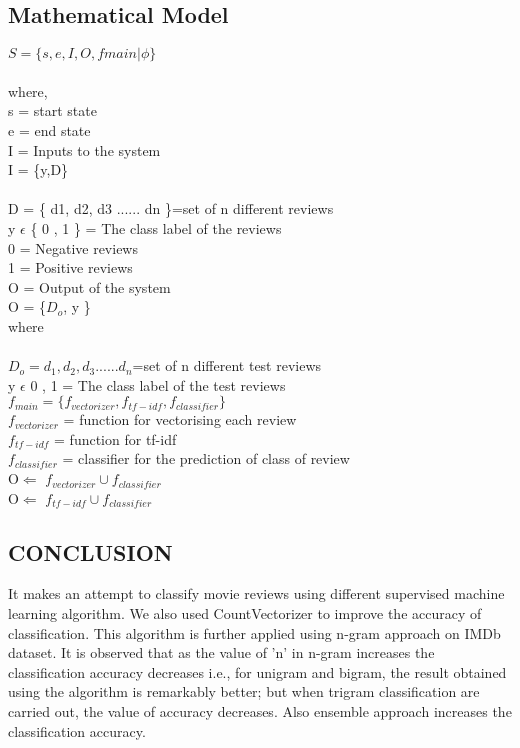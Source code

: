 \documentclass[10pt]{article}
\begin{document}
{\subsection{Mathematical Model}
$S=\{s,e,I,O,fmain|\phi\}$\\\\ 
where,\\
s = start state\\
e = end state\\
I = Inputs to the system\\
I = \{y,D\}\\\\
D = \{ d1, d2, d3 ...... dn \}=set of n different reviews\\
y $\epsilon$ \{ 0 , 1 \} = The class label of the reviews\\
0 = Negative reviews\\
1 = Positive reviews\\
O = Output of the system\\
O = \{$D_o$, y \}\\
where\\\\
$D_o = { d_1, d_2, d_3 ...... d_n }$=set of n different test reviews\\
y $\epsilon$ { 0 , 1 } = The class label of the test reviews\\
$f_{main} = \{f_{vectorizer} , f_{tf-idf} ,f_{classifier} \}$\\
$f_{vectorizer}$ = function for vectorising each review\\
$f_{tf-idf}$ = function for tf-idf\\
$f_{classifier}$ = classifier for the prediction of class of review\\
O$\Leftarrow$ $f_{vectorizer} \cup f_{classifier}$\\
O$\Leftarrow$ $f_{tf-idf} \cup f_{classifier}$\\


\newpage
\begin{center}

\section{CONCLUSION}

\end{center}


It makes an attempt to classify movie reviews using different supervised machine learning algorithm.
We also used CountVectorizer to improve the accuracy of classification.
This algorithm is further applied using n-gram approach on IMDb dataset. It is
observed that as the value of 'n' in n-gram increases the classification 
accuracy decreases i.e., for unigram and bigram, the result
obtained using the algorithm is remarkably better; but when trigram classification are carried out, the value
of accuracy decreases. Also ensemble approach increases the classification accuracy.
\hspace{5mm}



}
\end{document}
